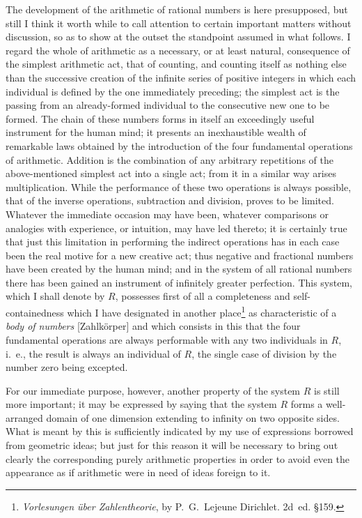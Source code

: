 \documentclass[twoside,openright]{article}
\begin{document}
The development of the arithmetic of rational numbers is here
presupposed, but still I think it worth while to call attention to
certain important matters without discussion, so as to show at the
outset the standpoint assumed in what follows. I regard the whole of
arithmetic as a necessary, or at least natural, consequence of the
simplest arithmetic act, that of counting, and counting itself as
nothing else than the successive creation of the infinite series of
positive integers in which each individual is defined by the one
immediately preceding; the simplest act is the passing from an
already-formed individual to the consecutive new one to be formed. The
chain of these numbers forms in itself an exceedingly useful
instrument for the human mind; it presents an inexhaustible wealth of
remarkable laws obtained by the introduction of the four fundamental
operations of arithmetic.  Addition is the combination of any
arbitrary repetitions of the above-mentioned simplest act into a
single act; from it in a similar way arises multiplication.  While the
performance of these two operations is always possible, that of the
inverse operations, subtraction and division, proves to be
limited. Whatever the immediate occasion may have been, whatever
comparisons or analogies with experience, or intuition, may have led
thereto; it is certainly true that just this limitation in performing
the indirect operations has in each case been the real motive for a
new creative act; thus negative and fractional numbers have been
created by the human mind; and in the system of all rational numbers
there has been gained an instrument of infinitely greater
perfection. This system, which I shall denote by $R$, possesses first
of all a completeness and self-containedness which I have designated
in another place\footnote{\textit{Vorlesungen über Zahlentheorie}, by
  P.~G.~Lejeune Dirichlet. 2d~ed. §159.} as characteristic of a
\textit{body of numbers} [Zahlkörper] and which consists in this that
the four fundamental operations are always performable with any two
individuals in $R$, i.~e., the result is always an individual of $R$,
the single case of division by the number zero being excepted.

For our immediate purpose, however, another property of the system $R$
is still more important; it may be expressed by saying that the system
$R$ forms a well-arranged domain of one dimension extending to
infinity on two opposite sides. What is meant by this is sufficiently
indicated by my use of expressions borrowed from geometric ideas; but
just for this reason it will be necessary to bring out clearly the
corresponding purely arithmetic properties in order to avoid even the
appearance as if arithmetic were in need of ideas foreign to it.
\end{document}
